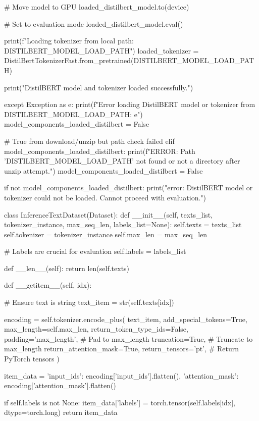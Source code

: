 \begin{ffcode}
        # Move model to GPU
        loaded_distilbert_model.to(device)

        # Set to evaluation mode
        loaded_distilbert_model.eval()

        print(f"Loading tokenizer from local path: {DISTILBERT_MODEL_LOAD_PATH}")
        loaded_tokenizer = DistilBertTokenizerFast.from_pretrained(DISTILBERT_MODEL_LOAD_PATH)

        print("DistilBERT model and tokenizer loaded successfully.")

    except Exception as e:
        print(f"Error loading DistilBERT model or tokenizer from {DISTILBERT_MODEL_LOAD_PATH}: {e}")
        model_components_loaded_distilbert = False

# True from download/unzip but path check failed
elif model_components_loaded_distilbert:
    print(f"ERROR: Path '{DISTILBERT_MODEL_LOAD_PATH}' not found or not a directory after unzip attempt.")
    model_components_loaded_distilbert = False

if not model_components_loaded_distilbert:
    print("\nCritical error: DistilBERT model or tokenizer could not be loaded. Cannot proceed with evaluation.")

class InferenceTextDataset(Dataset):
    def __init__(self, texts_list, tokenizer_instance, max_seq_len, labels_list=None):
        self.texts = texts_list
        self.tokenizer = tokenizer_instance
        self.max_len = max_seq_len

        # Labels are crucial for evaluation
        self.labels = labels_list

    def __len__(self):
        return len(self.texts)

    def __getitem__(self, idx):

        # Ensure text is string
        text_item = str(self.texts[idx])

        encoding = self.tokenizer.encode_plus(
            text_item,
            add_special_tokens=True,
            max_length=self.max_len,
            return_token_type_ids=False,
            padding='max_length', # Pad to max_length
            truncation=True,      # Truncate to max_length
            return_attention_mask=True,
            return_tensors='pt',  # Return PyTorch tensors
        )

        item_data = {
            'input_ids': encoding['input_ids'].flatten(),
            'attention_mask': encoding['attention_mask'].flatten()
        }

        if self.labels is not None:
            item_data['labels'] = torch.tensor(self.labels[idx], dtype=torch.long)
        return item_data


\end{ffcode}
